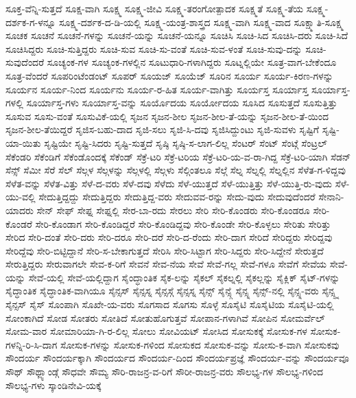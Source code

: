 {ಸೂಕ್ತ-ವೆನ್ನಿ-ಸುತ್ತದೆ
ಸೂಕ್ಷ-ವಾಗಿ
ಸೂಕ್ಷ್ಮ
ಸೂಕ್ಷ್ಮ-ಜೀವಿ
ಸೂಕ್ಷ್ಮ-ತರಂಗೋತ್ಪಾದಕ
ಸೂಕ್ಷ್ಮತೆ
ಸೂಕ್ಷ್ಮ-ತೆಯ
ಸೂಕ್ಷ್ಮ-ದರ್ಶಕ-ಗ-ಳನ್ನೂ
ಸೂಕ್ಷ್ಮ-ದರ್ಶಕ-ದ-ಡಿ-ಯಲ್ಲಿ
ಸೂಕ್ಷ್ಮ-ಯಂತ್ರ-ಶಾಸ್ತ್ರದ
ಸೂಕ್ಷ್ಮ-ವಾಗಿ
ಸೂಕ್ಷ್ಮ-ವಾದ
ಸೂಕ್ಷ್ಮಾತಿ-ಸೂಕ್ಷ್ಮ
ಸೂಚಕ
ಸೂಚನೆ
ಸೂಚನೆ-ಗಳನ್ನು
ಸೂಚನೆ-ಯನ್ನು
ಸೂಚನೆ-ಯನ್ನೂ
ಸೂಚಿಸಿ
ಸೂಚಿ-ಸಿದ
ಸೂಚಿಸಿ-ದರು
ಸೂಚಿ-ಸಿದೆ
ಸೂಚಿಸಿದ್ದರು
ಸೂಚಿ-ಸುತ್ತಿದ್ದರು
ಸೂಚಿ-ಸುವ
ಸೂಚಿ-ಸು-ವಂತೆ
ಸೂಚಿ-ಸುವ-ಳಂತೆ
ಸೂಚಿ-ಸುವು-ದನ್ನು
ಸೂಚಿ-ಸುವುದೆಂದರೆ
ಸೂಚ್ಯಂಕ-ಗಳ
ಸೂಚ್ಯಂಕ-ಗಳಲ್ಲಿನ
ಸೂಟುಧಾರಿ-ಗಳಾಗಿದ್ದರು
ಸೂಟ್ನಲ್ಲಿಯೇ
ಸೂತ್ರ-ವಾಗ-ಬೇಕೆಂದೂ
ಸೂತ್ರ-ವೆಂದರೆ
ಸೂಪರಿಂಟೆಂಡಂಟ್
ಸೂಪರ್
ಸೂಯಜ್
ಸೂಯೆಜ್
ಸೂರಿನ
ಸೂರ್ಯ
ಸೂರ್ಯ-ಕಿರಣ-ಗಳನ್ನು
ಸೂರ್ಯನ
ಸೂರ್ಯ-ನಿಂದ
ಸೂರ್ಯನು
ಸೂರ್ಯ-ರ-ಹಿತ
ಸೂರ್ಯ-ವಾಗಿತ್ತು
ಸೂರ್ಯಸ್ತ
ಸೂರ್ಯಾಸ್ತ
ಸೂರ್ಯಾಸ್ತ-ಗಳಲ್ಲಿ
ಸೂರ್ಯಾಸ್ತ-ಗಳು
ಸೂರ್ಯಾಸ್ತ-ವನ್ನು
ಸೂರ್ಯೊದಯ
ಸೂರ್ಯೋದಯ
ಸೂಸಿದ
ಸೂಸುತ್ತದೆ
ಸೂಸುತ್ತಿತ್ತು
ಸೂಸುವ
ಸೂಸು-ವಂತೆ
ಸೂಸುವಿಕೆ-ಯಲ್ಲಿ
ಸೃಜನ
ಸೃಜನ-ಶೀಲ
ಸೃಜನ-ಶೀಲ-ತೆ-ಯನ್ನು
ಸೃಜನ-ಶೀಲ-ತೆ-ಯಿಂದ
ಸೃಜನ-ಶೀಲ-ತೆಯಿದ್ದರೆ
ಸೃಜಿಸ-ಬಹು-ದಾದ
ಸೃಜಿ-ಸಲು
ಸೃಜಿ-ಸಿ-ದವು
ಸೃಜಿಸಿದ್ದುಂಟು
ಸೃಜಿ-ಸುವಳು
ಸೃಷ್ಟಿಗೆ
ಸೃಷ್ಟಿ-ಯಾ-ಯಿತು
ಸೃಷ್ಟಿಯೇ
ಸೃಷ್ಟಿ-ಸಿದರು
ಸೃಷ್ಟಿ-ಸುತ್ತದೆ
ಸೃಷ್ಠಿ
ಸೃಷ್ಠಿ-ಸ-ಲಾಗ-ಲಿಲ್ಲ
ಸೆಂಟರ್
ಸೆಂಟ್
ಸೆಂಟ್ಗೆ
ಸೆಂಟ್ರಲ್
ಸೆಕೆಂಡರಿ
ಸೆಕೆಂಡಿಗೆ
ಸೆಕೆಂಡೊಂದಕ್ಕೆ
ಸೆಕೆಂಡ್
ಸೆಕ್ರೆ-ಟರಿ
ಸೆಕ್ರೆ-ಟರಿಯ
ಸೆಕ್ರೆ-ಟರಿ-ಯ-ವ-ರಾ-ಗಿದ್ದ
ಸೆಕ್ರೆ-ಟರಿ-ಯಾಗಿ
ಸೆಡನ್
ಸೆನ್ಸ್
ಸೆಮೀ
ಸೆರೆ
ಸೆಲ್
ಸೆಲ್ಗಳ
ಸೆಲ್ಗಳನ್ನು
ಸೆಲ್ಗಳಲ್ಲಿ
ಸೆಲ್ಗಳು
ಸೆಲ್ಗಿಂತಲೂ
ಸೆಲ್ಗೆ
ಸೆಲ್ನ
ಸೆಲ್ನಲ್ಲಿ
ಸೆಲ್ನಲ್ಲಿನ
ಸೆಳೆತ-ಗ-ಳಿದ್ದವು
ಸೆಳೆತ-ವನ್ನು
ಸೆಳೆತ-ವಿತ್ತು
ಸೆಳೆ-ದ-ವರು
ಸೆಳೆ-ದವು
ಸೆಳೆದು
ಸೆಳೆ-ಯುತ್ತದೆ
ಸೆಳೆ-ಯುತ್ತಿತ್ತು
ಸೆಳೆ-ಯುತ್ತಿ-ರು-ವುದು
ಸೆಳೆ-ಯು-ವಲ್ಲಿ
ಸೇದುತ್ತಿದ್ದದ್ದು
ಸೇದುತ್ತಿದ್ದರು
ಸೇದುತ್ತಿದ್ದ-ವರು
ಸೇದುವವ-ರನ್ನು
ಸೇದು-ವುದು
ಸೇದುವುದೆಂದರೆ
ಸೇನಾನಿ-ಯಾದರು
ಸೇನ್
ಸೇಫ್
ಸೇಫ್ನ
ಸೇಫ್ನಲ್ಲಿ
ಸೇರ-ಬಾ-ರದು
ಸೇರಲು
ಸೇರಿ
ಸೇರಿ-ಕೊಂಡರು
ಸೇರಿ-ಕೊಂಡರೂ
ಸೇರಿ-ಕೊಂಡರೆ
ಸೇರಿ-ಕೊಂಡಾಗ
ಸೇರಿ-ಕೊಂಡಿದ್ದರೆ
ಸೇರಿ-ಕೊಂಡಿದ್ದವು
ಸೇರಿ-ಕೊಂಡೇ
ಸೇರಿ-ಕೊಳ್ಳಲು
ಸೇರಿತು
ಸೇರಿತ್ತು
ಸೇರಿದ
ಸೇರಿ-ದಂತೆ
ಸೇರಿ-ದರು
ಸೇರಿ-ದರೂ
ಸೇರಿ-ದರೆ
ಸೇರಿ-ದ-ರೆಂದು
ಸೇರಿ-ದಾಗ
ಸೇರಿದೆ
ಸೇರಿದ್ದರು
ಸೇರಿದ್ದವು
ಸೇರಿದ್ದೆವು
ಸೇರಿ-ಬಿಟ್ಟಿದ್ದಾನೆ
ಸೇರಿ-ಸ-ಬೇಕಾಗುತ್ತದೆ
ಸೇರಿಸಿ
ಸೇರಿ-ಸಿಟ್ಟಾಗ
ಸೇರಿ-ಸಿದ್ದರು
ಸೇರಿ-ಸಿದ್ದೇನೆ
ಸೇರುತ್ತದೆ
ಸೇರುತ್ತಿದ್ದರು
ಸೇರುವಾಗಲೇ
ಸೇವ-ಕ-ರಿಗೆ
ಸೇವನೆ
ಸೇವ-ನೆಯ
ಸೇವೆ
ಸೇವೆ-ಗಲ್ಲ
ಸೇವೆ-ಗಳೂ
ಸೇವೆಗೆ
ಸೇವೆಯ
ಸೇವೆ-ಯನ್ನು
ಸೇವೆ-ಯಲ್ಲಿ
ಸೇವೆ-ಯಲ್ಲಿದ್ದಾಗ
ಸೈಂದ್ಧಾಂತಿಕ
ಸೈಕ-ಲನ್ನು
ಸೈಕಲ್
ಸೈಕಲ್ನಲ್ಲಿ
ಸೈಕಲ್ಲನ್ನು
ಸೈಕ್ಲಿಕ್
ಸೈಟ್-ಗಳನ್ನು
ಸೈದ್ಧಾಂತಿಕ
ಸೈದ್ಧಾಂತಿಕ-ವಾಗಿಯೂ
ಸೈನ್ಸಸ್
ಸೈನ್ಸಸ್ನ
ಸೈನ್ಸಸ್ಗೆ
ಸೈನ್ಸಸ್ನ
ಸೈನ್ಸ್
ಸೈನ್ಸ್ಗೆ
ಸೈನ್ಸ್ನ
ಸೈನ್ಸ್-ನಲ್ಲಿ
ಸೈನ್ಸ್ನ-ವರು
ಸೈನ್ಸ್ಸ್ನ
ಸೈನ್ಸಸ್
ಸೈಸ್
ಸೊಂಪಾಗಿ
ಸೊಖೇ-ಯ-ವರು
ಸೊಗಸಾದ
ಸೊಗಸು
ಸೊಳ್ಳೆ
ಸೊಸೈಟಿ
ಸೊಸೈಟಿಯ
ಸೊಸೈಟಿ-ಯಲ್ಲಿ
ಸೋಂಕಾಗಿದೆ
ಸೋಡ
ಸೋತರು
ಸೋತಿದೆ
ಸೋತುಹೊಗುತ್ತವೆ
ಸೋಪಾನ-ಗಳಾಗಿವೆ
ಸೋಪಿನ
ಸೋಮರ್ವೆಲ್
ಸೋಮ-ವಾರ
ಸೋಮಾರಿಯಾ-ಗಿ-ರ-ಲಿಲ್ಲ
ಸೋಲು
ಸೋವಿಯಟ್
ಸೋಸಿದ
ಸೋಸುಕಕ್ಕೆ
ಸೋಸುಕ-ಗಳ
ಸೋಸುಕ-ಗಳನ್ನಿ-ರಿ-ಸಿ-ದಾಗ
ಸೋಸುಕ-ಗಳನ್ನು
ಸೋಸುಕ-ಗಳಿಂದ
ಸೋಸುಕದ
ಸೋಸುಕ-ವನ್ನು
ಸೋಸು-ಕ-ವಾಗಿ
ಸೋಸುಕವು
ಸೌಂದರ್ಯ
ಸೌಂದರ್ಯಕ್ಕಾಗಿ
ಸೌಂದರ್ಯದ
ಸೌಂದರ್ಯ-ದಿಂದ
ಸೌಂದರ್ಯಪ್ರಜ್ಞೆ
ಸೌಂದರ್ಯ-ವನ್ನು
ಸೌಂದರ್ಯವೂ
ಸೌಥ್
ಸೌಥ್ಲ್ಯಾಂಡ್ಗೆ
ಸೌಧವೇ
ಸೌಮ್ಯ
ಸೌರಿ-ರಾಜನ್ರ-ವ-ರಿಗೆ
ಸೌರೀ-ರಾಜನ್ರ-ವರು
ಸೌಲಭ್ಯ-ಗಳ
ಸೌಲಭ್ಯ-ಗಳಿಂದ
ಸೌಲಭ್ಯ-ಗಳು
ಸ್ಕಾಂಡಿನೇವಿ-ಯಕ್ಕೆ
}
